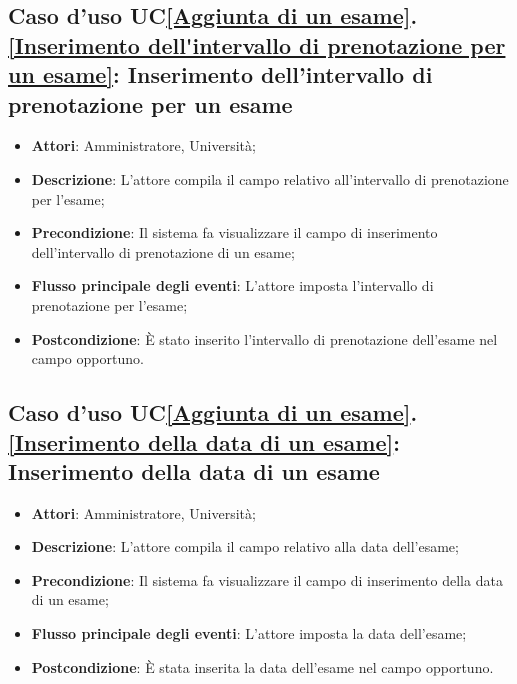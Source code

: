 \subsection{Caso d'uso UC\ref{Aggiunta di un esame}.\ref{Inserimento dell'intervallo di prenotazione per un esame}: Inserimento dell'intervallo di prenotazione per un esame}
\begin{itemize}
	\item \textbf{Attori}: Amministratore, Università;
	\item \textbf{Descrizione}: L'attore compila il campo relativo all'intervallo di prenotazione per l'esame;
	
	\item \textbf{Precondizione}: Il sistema fa visualizzare il campo di inserimento dell'intervallo di prenotazione di un esame;
	
	\item \textbf{Flusso principale degli eventi}: L'attore imposta l'intervallo di prenotazione per l'esame;
	
	\item \textbf{Postcondizione}: È stato inserito l'intervallo di prenotazione dell'esame nel campo opportuno.
	
\end{itemize}

\subsection{Caso d'uso UC\ref{Aggiunta di un esame}.\ref{Inserimento della data di un esame}: Inserimento della data di un esame}
\begin{itemize}
	\item \textbf{Attori}: Amministratore, Università;
	\item \textbf{Descrizione}: L'attore compila il campo relativo alla data dell'esame;
	
	\item \textbf{Precondizione}: Il sistema fa visualizzare il campo di inserimento della data di un esame;
	
	\item \textbf{Flusso principale degli eventi}: L'attore imposta la data dell'esame;
	
	\item \textbf{Postcondizione}: È stata inserita la data dell'esame nel campo opportuno.
	
\end{itemize}

